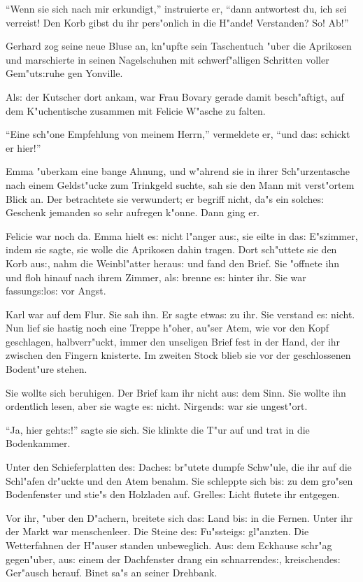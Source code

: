 \documentclass[oneside,12pt]{book}
\newcommand{\s}{s:}%
\begin{document}
"`Wenn sie sich nach mir erkundigt,"' instruierte er, "`dann
antwortest du, ich sei verreist! Den Korb gibst du ihr pers"onlich
in die H"ande! Verstanden? So! Ab!"'

Gerhard zog seine neue Bluse an, kn"upfte sein Taschentuch "uber
die Aprikosen und marschierte in seinen Nagelschuhen mit
schwerf"alligen Schritten voller Gem"ut{\s}ruhe gen Yonville.

Al{\s} der Kutscher dort ankam, war Frau Bovary gerade damit
besch"aftigt, auf dem K"uchentische zusammen mit Felicie W"asche
zu falten.

"`Eine sch"one Empfehlung von meinem Herrn,"' vermeldete er, "`und
da{\s} schickt er hier!"'

Emma "uberkam eine bange Ahnung, und w"ahrend sie in ihrer
Sch"urzentasche nach einem Geldst"ucke zum Trinkgeld suchte, sah
sie den Mann mit verst"ortem Blick an. Der betrachtete sie
verwundert; er begriff nicht, da"s ein solche{\s} Geschenk
jemanden so sehr aufregen k"onne. Dann ging er.

Felicie war noch da. Emma hielt e{\s} nicht l"anger au{\s}, sie
eilte in da{\s} E"szimmer, indem sie sagte, sie wolle die
Aprikosen dahin tragen. Dort sch"uttete sie den Korb au{\s}, nahm
die Weinbl"atter herau{\s} und fand den Brief. Sie "offnete ihn
und floh hinauf nach ihrem Zimmer, al{\s} brenne e{\s} hinter ihr.
Sie war fassung{\s}lo{\s} vor Angst.

Karl war auf dem Flur. Sie sah ihn. Er sagte etwa{\s} zu ihr. Sie
verstand e{\s} nicht. Nun lief sie hastig noch eine Treppe h"oher,
au"ser Atem, wie vor den Kopf geschlagen, halbverr"uckt, immer den
unseligen Brief fest in der Hand, der ihr zwischen den Fingern
knisterte. Im zweiten Stock blieb sie vor der geschlossenen
Bodent"ure stehen.

Sie wollte sich beruhigen. Der Brief kam ihr nicht au{\s} dem
Sinn. Sie wollte ihn ordentlich lesen, aber sie wagte e{\s} nicht.
Nirgend{\s} war sie ungest"ort.

"`Ja, hier geht{\s}!"' sagte sie sich. Sie klinkte die T"ur auf
und trat in die Bodenkammer.

Unter den Schieferplatten de{\s} Dache{\s} br"utete dumpfe
Schw"ule, die ihr auf die Schl"afen dr"uckte und den Atem benahm.
Sie schleppte sich bi{\s} zu dem gro"sen Bodenfenster und stie"s
den Holzladen auf. Grelle{\s} Licht flutete ihr entgegen.

Vor ihr, "uber den D"achern, breitete sich da{\s} Land bi{\s} in
die Fernen. Unter ihr der Markt war menschenleer. Die Steine
de{\s} Fu"ssteig{\s} gl"anzten. Die Wetterfahnen der H"auser
standen unbeweglich. Au{\s} dem Eckhause schr"ag gegen"uber,
au{\s} einem der Dachfenster drang ein schnarrende{\s},
kreischende{\s} Ger"ausch herauf. Binet sa"s an seiner Drehbank.
\end{document}
